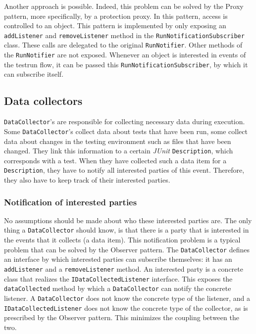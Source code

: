 \documentclass[i2]{oss}
\newcommand{\class}[1]{\texttt{#1}}
\newcommand{\method}[1]{\texttt{#1}}
\newcommand{\junit}{\emph{JUnit }}
\begin{document}
Another approach is possible.
Indeed, this problem can be solved by the Proxy pattern, more specifically, by a protection proxy.
In this pattern, access is controlled to an object.
This pattern is implemented by only exposing an \method{addListener} and \method{removeListener} method in the \class{RunNotificationSubscriber} class.
These calls are delegated to the original \class{RunNotifier}.
Other methods of the \class{RunNotifier} are not exposed.
Whenever an object is interested in events of the testrun flow, it can be passed this \class{RunNotificationSubscriber}, by which it can subscribe itself.



\subsection{Data collectors}
\label{subssec:Data collectors}

\class{DataCollector}'s are responsible for collecting necessary data 
during execution.
Some \class{DataCollector}'s collect data about tests that have been 
run, some collect data about changes in the testing environment such as 
files that have been changed.
They link this information to a certain \junit \class{Description}, which corresponds with a test.
When they have collected such a data item for a \class{Description}, they have to notify all interested parties of this event.
Therefore, they also have to keep track of their interested parties.

\subsubsection{Notification of interested parties}

No assumptions should be made about who these interested parties are.
The only thing a \class{DataCollector} should  know, is that there is a party that is interested in the events that it collects (a data item).
This notification problem is a typical problem that can be solved by the Observer pattern.
The \class{DataCollector} defines an interface by which interested parties can subscribe themselves: it has an \method{addListener} and a \method{removeListener} method. 
An interested party is a concrete class that realizes the \class{IDataCollectedListener} interface. This exposes the \method{dataCollected} method by which a \class{DataCollector} can notify the concrete listener.
A \class{DataCollector} does not know the concrete type of the listener, and a \class{IDataCollectedListener} does not know the concrete type of the collector, as is prescribed by the Observer pattern.
This minimizes the coupling between the two.
\end{document}
